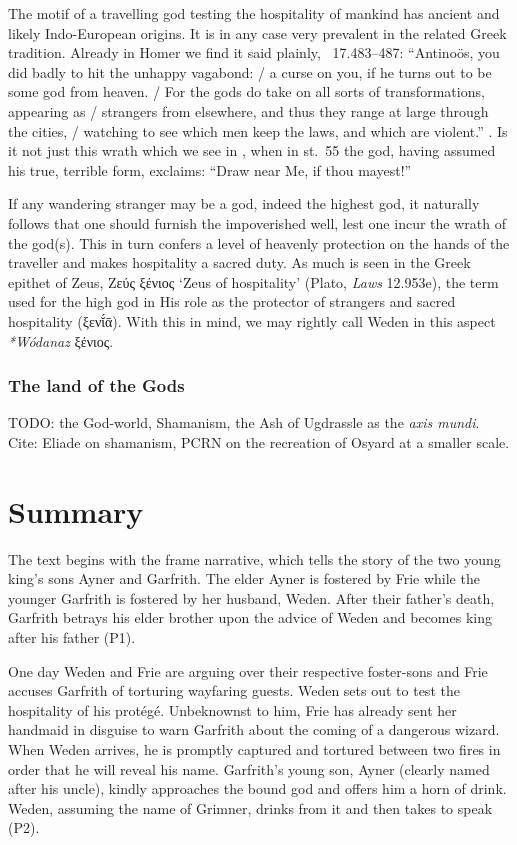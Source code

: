 The motif of a travelling god testing the hospitality of mankind has ancient and likely Indo-European origins.  It is in any case very prevalent in the related Greek tradition.  Already in Homer we find it said plainly, \Odyssey\ 17.483--487: “Antinoös, you did badly to hit the unhappy vagabond: / a curse on you, if he turns out to be some god from heaven. / For the gods do take on all sorts of transformations, appearing as / strangers from elsewhere, and thus they range at large through the cities, / watching to see which men keep the laws, and which are violent.” \parencite{LattimoreOd}.  Is it not just this wrath which we see in \Grimnismal, when in st.~55 the god, having assumed his true, terrible form, exclaims: “Draw near Me, if thou mayest!”

If any wandering stranger may be a god, indeed the highest god, it naturally follows that one should furnish the impoverished well, lest one incur the wrath of the god(s).  This in turn confers a level of heavenly protection on the hands of the traveller and makes hospitality a sacred duty.  As much is seen in the Greek epithet of Zeus, \textgreek{Ζεύς ξένιος} ‘Zeus of hospitality’ (Plato, \emph{Laws} 12.953e), the term used for the high god in His role as the protector of strangers and sacred hospitality (\textgreek{ξενῐ́ᾱ}).  With this in mind, we may rightly call Weden in this aspect \emph{*Wódanaz} \textgreek{ξένιος}.

\subsubsection{The land of the Gods}

TODO: the God-world, Shamanism, the Ash of Ugdrassle as the \emph{axis mundi}.  Cite: Eliade on shamanism, PCRN on the recreation of Osyard at a smaller scale.

\section{Summary}

The text begins with the frame narrative, which tells the story of the two young king’s sons Ayner and Garfrith.  The elder Ayner is fostered by Frie while the younger Garfrith is fostered by her husband, Weden.  After their father’s death, Garfrith betrays his elder brother upon the advice of Weden and becomes king after his father (P1).

One day Weden and Frie are arguing over their respective foster-sons and Frie accuses Garfrith of torturing wayfaring guests.  Weden sets out to test the hospitality of his protégé.  Unbeknownst to him, Frie has already sent her handmaid in disguise to warn Garfrith about the coming of a dangerous wizard.  When Weden arrives, he is promptly captured and tortured between two fires in order that he will reveal his name.  Garfrith’s young son, Ayner (clearly named after his uncle), kindly approaches the bound god and offers him a horn of drink.  Weden, assuming the name of Grimner, drinks from it and then takes to speak (P2).

